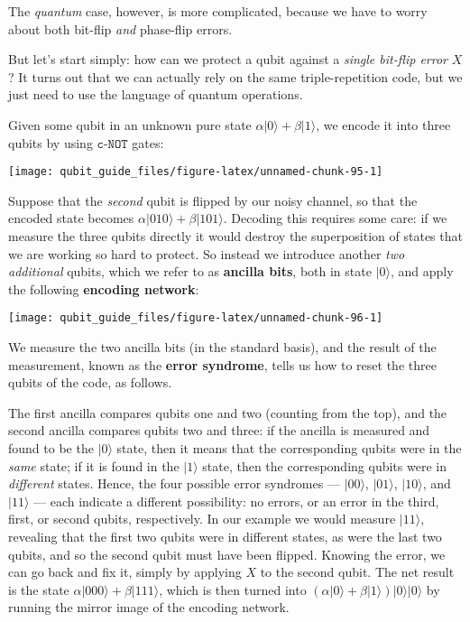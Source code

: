 \documentclass[fleqn]{article}
\begin{document}
The \emph{quantum} case, however, is more complicated, because we have to worry about both bit-flip \emph{and} phase-flip errors.

But let's start simply: how can we protect a qubit against a \emph{single bit-flip error} \(X\)?
It turns out that we can actually rely on the same triple-repetition code, but we just need to use the language of quantum operations.

Given some qubit in an unknown pure state \(\alpha|0\rangle + \beta|1\rangle\), we encode it into three qubits by using \(\texttt{c-NOT}\) gates:

\begin{center}\texttt{[image: qubit\_guide\_files/figure-latex/unnamed-chunk-95-1]} \end{center}

Suppose that the \emph{second} qubit is flipped by our noisy channel, so that the encoded state becomes \(\alpha|010\rangle + \beta|101\rangle\).
Decoding this requires some care: if we measure the three qubits directly it would destroy the superposition of states that we are working so hard to protect.
So instead we introduce another \emph{two additional} qubits, which we refer to as \textbf{ancilla bits}, both in state \(|0\rangle\), and apply the following \textbf{encoding network}:

\begin{center}\texttt{[image: qubit\_guide\_files/figure-latex/unnamed-chunk-96-1]} \end{center}

We measure the two ancilla bits (in the standard basis), and the result of the measurement, known as the \textbf{error syndrome}, tells us how to reset the three qubits of the code, as follows.

The first ancilla compares qubits one and two (counting from the top), and the second ancilla compares qubits two and three: if the ancilla is measured and found to be the \(|0\rangle\) state, then it means that the corresponding qubits were in the \emph{same} state; if it is found in the \(|1\rangle\) state, then the corresponding qubits were in \emph{different} states.
Hence, the four possible error syndromes --- \(|00\rangle\), \(|01\rangle\), \(|10\rangle\), and \(|11\rangle\) --- each indicate a different possibility: no errors, or an error in the third, first, or second qubits, respectively.
In our example we would measure \(|11\rangle\), revealing that the first two qubits were in different states, as were the last two qubits, and so the second qubit must have been flipped.
Knowing the error, we can go back and fix it, simply by applying \(X\) to the second qubit.
The net result is the state \(\alpha|000\rangle + \beta|111\rangle\), which is then turned into \((\alpha|0\rangle + \beta|1\rangle)|0\rangle|0\rangle\) by running the mirror image of the encoding network.
\end{document}

